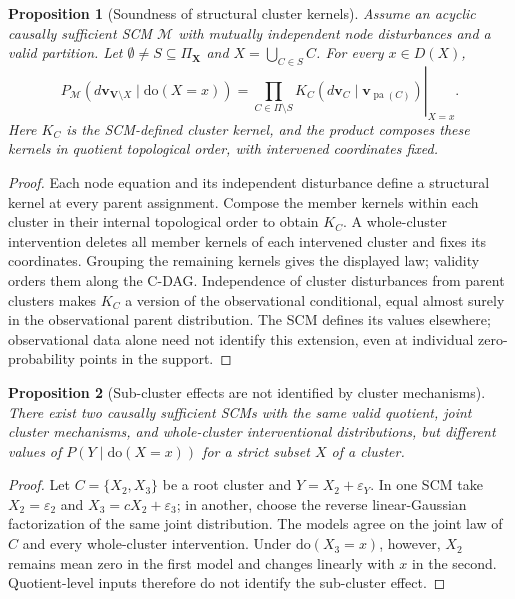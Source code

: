 \documentclass[twoside]{article}
\newtheorem{proposition}{Proposition}
\newcommand{\doo}{\mathrm{do}}
\begin{document}
\begin{proposition}[Soundness of structural cluster kernels]
\label{prop:cluster-soundness}
Assume an acyclic causally sufficient SCM \(\mathcal M\) with mutually independent node disturbances and a valid partition. Let
$\emptyset\ne S\subseteq\Pi_{\mathbf X}$ and
$X=\bigcup_{C\in S}C$. For every $x\in D(X)$,
\[
 P_{\mathcal M}(d\mathbf v_{\mathbf V\setminus X}\mid\doo(X=x))
 =\left.
 \prod_{C\in\Pi\setminus S}
 K_C(d\mathbf v_C\mid\mathbf v_{\operatorname{pa}(C)})
 \right|_{X=x}.
\]
Here \(K_C\) is the SCM-defined cluster kernel, and the product composes these kernels in quotient topological order, with intervened coordinates fixed.
\end{proposition}

\begin{proof}
Each node equation and its independent disturbance define a structural kernel at every parent assignment. Compose the member kernels within each cluster in their internal topological order to obtain \(K_C\). A whole-cluster intervention deletes all member kernels of each intervened cluster and fixes its coordinates. Grouping the remaining kernels gives the displayed law; validity orders them along the C-DAG. Independence of cluster disturbances from parent clusters makes \(K_C\) a version of the observational conditional, equal almost surely in the observational parent distribution. The SCM defines its values elsewhere; observational data alone need not identify this extension, even at individual zero-probability points in the support.
\end{proof}

\begin{proposition}[Sub-cluster effects are not identified by cluster mechanisms]
\label{prop:qexposure}
There exist two causally sufficient SCMs with the same valid quotient, joint cluster mechanisms, and whole-cluster interventional distributions, but different values of \(P(Y\mid\doo(X=x))\) for a strict subset \(X\) of a cluster.
\end{proposition}

\begin{proof}
Let \(C=\{X_2,X_3\}\) be a root cluster and \(Y=X_2+\varepsilon_Y\). In one SCM take \(X_2=\varepsilon_2\) and \(X_3=cX_2+\varepsilon_3\); in another, choose the reverse linear-Gaussian factorization of the same joint distribution. The models agree on the joint law of \(C\) and every whole-cluster intervention. Under \(\doo(X_3=x)\), however, \(X_2\) remains mean zero in the first model and changes linearly with \(x\) in the second. Quotient-level inputs therefore do not identify the sub-cluster effect.
\end{proof}
\end{document}
